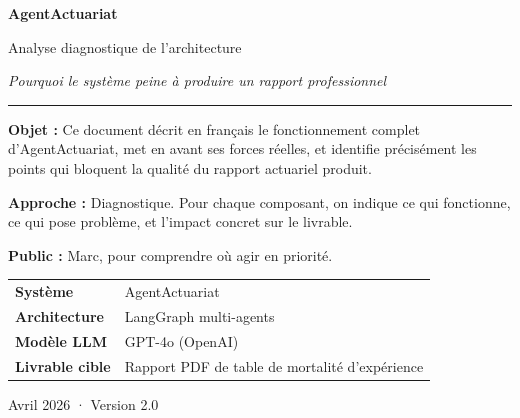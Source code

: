 \documentclass[12pt,a4paper]{article}
\begin{document}

\begin{titlepage}
\centering
\vspace*{1.5cm}
{\fontsize{30}{36}\bfseries\color{agentblue} AgentActuariat\par}
\vspace{0.4cm}
{\Large\color{gray} Analyse diagnostique de l'architecture\par}
\vspace{0.3cm}
{\large\color{agentred}\textit{Pourquoi le système peine à produire un rapport professionnel}\par}
\vspace{1.5cm}
\rule{0.7\linewidth}{0.6pt}
\vspace{1cm}

\begin{tcolorbox}[colback=agentgray, colframe=agentblue!25,
                  width=0.85\textwidth, arc=6pt]
\small
\textbf{Objet :} Ce document décrit en français le fonctionnement complet
d'AgentActuariat, met en avant ses forces réelles, et identifie précisément
les points qui bloquent la qualité du rapport actuariel produit.

\medskip
\textbf{Approche :} Diagnostique. Pour chaque composant, on indique ce qui
fonctionne, ce qui pose problème, et l'impact concret sur le livrable.

\medskip
\textbf{Public :} Marc, pour comprendre où agir en priorité.
\end{tcolorbox}

\vfill
\begin{center}
\begin{tabular}{ll}
\toprule
\textbf{Système}        & AgentActuariat \\
\textbf{Architecture}   & LangGraph multi-agents \\
\textbf{Modèle LLM}     & GPT-4o (OpenAI) \\
\textbf{Livrable cible} & Rapport PDF de table de mortalité d'expérience \\
\bottomrule
\end{tabular}
\end{center}

\vspace{1cm}
{\footnotesize\color{gray} Avril 2026 · Version 2.0\par}
\end{titlepage}

\tableofcontents
\newpage
\end{document}

